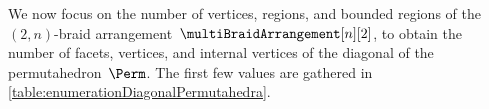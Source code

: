 
We now focus on the number of vertices, regions, and bounded regions of the $(2,n)$-braid arrangement~$\multiBraidArrangement[n][2]$, to obtain the number of facets, vertices, and internal vertices of the diagonal of the permutahedron~$\Perm$.
The first few values are gathered in \cref{table:enumerationDiagonalPermutahedra}.

\begin{table}
	\centerline{}
	\vspace{.3cm}
	\caption{The numbers of facets, vertices, and internal vertices of the diagonal of the permutahedron~$\Perm$ for~$n \in [9]$.}
	\label{table:enumerationDiagonalPermutahedra}
\end{table}

